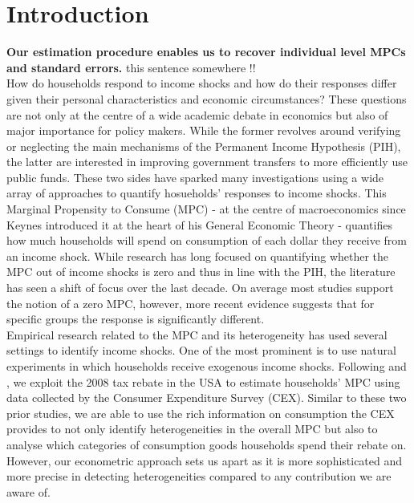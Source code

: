 \section{Introduction} \label{sec:intro}
\textbf{Our estimation procedure enables us to recover individual level MPCs and standard errors.} this sentence somewhere !! \\
How do households respond to income shocks and how do their responses differ given their personal characteristics and economic circumstances? These questions are not only at the centre of a wide academic debate in economics but also of major importance for policy makers. While the former revolves around verifying or neglecting the main mechanisms of the Permanent Income Hypothesis (PIH), the latter are interested in improving government transfers to more efficiently use public funds. These two sides have sparked many investigations using a wide array of approaches to quantify hosueholds' responses to income shocks. This Marginal Propensity to Consume (MPC) - at the centre of macroeconomics since Keynes introduced it at the heart of his General Economic Theory - quantifies how much households will spend on consumption of each dollar they receive from an income shock. While research has long focused on quantifying whether the MPC out of income shocks is zero and thus in line with the PIH, the literature has seen a shift of focus over the last decade. On average most studies support the notion of a zero MPC, however, more recent evidence suggests that for specific groups the response is significantly different. \\
Empirical research related to the MPC and its heterogeneity has used several settings to identify income shocks. One of the most prominent is to use natural experiments in which households receive exogenous income shocks. Following \cite{parker_etal_13} and \cite{ms_14}, we exploit the 2008 tax rebate in the USA to estimate households' MPC using data collected by the Consumer Expenditure Survey (CEX). Similar to these two prior studies, we are able to use the rich information on consumption the CEX provides to not only identify heterogeneities in the overall MPC but also to analyse which categories of consumption goods households spend their rebate on. However, our econometric approach sets us apart as it is more sophisticated and more precise in detecting heterogeneities compared to any contribution we are aware of.\\ 
